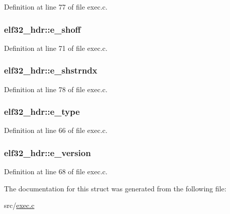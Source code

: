 Definition at line 77 of file exec.\+c.

\hypertarget{structelf32__hdr_afd8ce4ec0f05960b2306f98625be6db0}{
\subsubsection[{e\+\_\+shoff}]{ elf32\+\_\+hdr\+::e\+\_\+shoff}}\label{structelf32__hdr_afd8ce4ec0f05960b2306f98625be6db0}


Definition at line 71 of file exec.\+c.

\hypertarget{structelf32__hdr_afd7ed18333923147918975fdfa4ee99a}{
\subsubsection[{e\+\_\+shstrndx}]{ elf32\+\_\+hdr\+::e\+\_\+shstrndx}}\label{structelf32__hdr_afd7ed18333923147918975fdfa4ee99a}


Definition at line 78 of file exec.\+c.

\hypertarget{structelf32__hdr_a01aab87d9a8f658d41a1162158c07878}{
\subsubsection[{e\+\_\+type}]{ elf32\+\_\+hdr\+::e\+\_\+type}}\label{structelf32__hdr_a01aab87d9a8f658d41a1162158c07878}


Definition at line 66 of file exec.\+c.

\hypertarget{structelf32__hdr_a4324ae029dfd1967979b984a2f3e14e4}{
\subsubsection[{e\+\_\+version}]{ elf32\+\_\+hdr\+::e\+\_\+version}}\label{structelf32__hdr_a4324ae029dfd1967979b984a2f3e14e4}


Definition at line 68 of file exec.\+c.



The documentation for this struct was generated from the following file\+:\begin{DoxyCompactItemize}
\item 
src/\hyperlink{exec_8c}{exec.\+c}\end{DoxyCompactItemize}
